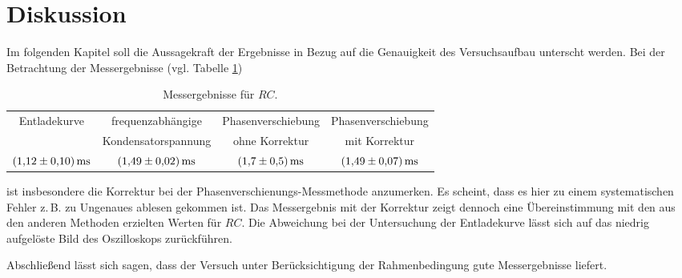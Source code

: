 \section{Diskussion}
Im folgenden Kapitel soll die Aussagekraft der Ergebnisse in Bezug auf die
Genauigkeit des Versuchsaufbau unterscht werden.
Bei der Betrachtung der Messergebnisse (vgl. Tabelle \ref{tab:messergebnisse})

\begin{table}
  \centering
  \caption{Messergebnisse für $RC$.}
  \label{tab:messergebnisse}
  \begin{tabular}{cccc}
    \toprule
    {Entladekurve} & {frequenzabhängige} & { Phasenverschiebung  } & {Phasenverschiebung} \\
    & { Kondensatorspannung} & {ohne Korrektur} & {mit Korrektur} \\
    \midrule
    $\SI{1.12\pm0.1}{\milli\second} $ & $\SI{1.49\pm0.02}{\milli\second}$ &
    $\SI{1.7\pm0.5}{\milli\second}$ & $\SI{1.49\pm0.07}{\milli\second}$ \\
    \bottomrule
  \end{tabular}
\end{table}

ist insbesondere die Korrektur bei der Phasenverschienungs-Messmethode anzumerken.
Es scheint, dass es hier zu einem systematischen Fehler z.\,B. zu Ungenaues ablesen gekommen ist.
Das Messergebnis mit der Korrektur zeigt dennoch eine Übereinstimmung mit den
aus den anderen Methoden erzielten Werten für $RC$.
Die Abweichung bei der Untersuchung der Entladekurve lässt sich auf das
niedrig aufgelöste Bild des Oszilloskops zurückführen.

Abschließend lässt sich sagen, dass der Versuch unter Berücksichtigung
der Rahmenbedingung gute Messergebnisse liefert.
